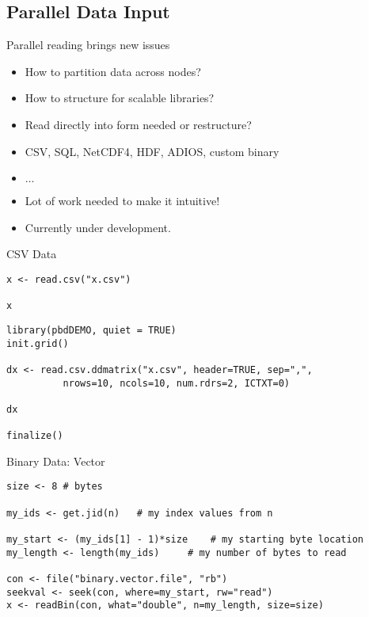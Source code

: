 \subsection{Parallel Data Input}
\makesubcontentsslidessec


\begin{frame}
  \begin{block}{Parallel reading brings new issues}\pause
    \begin{itemize}
    \item How to partition data across nodes?
    \item How to structure for scalable libraries?
    \item Read directly into form needed or restructure?
    \item CSV, SQL, NetCDF4, HDF, ADIOS, custom binary
    \item $\ldots$
    \item Lot of work needed to make it intuitive!
    \item Currently under development.
    \end{itemize}
  \end{block}
\end{frame}



\begin{frame}[fragile]
  \begin{exampleblock}{CSV Data}\pause
\begin{lstlisting}[title=Serial Code]
x <- read.csv("x.csv")

x
\end{lstlisting}

\begin{lstlisting}[title=Parallel Code]
library(pbdDEMO, quiet = TRUE)
init.grid()

dx <- read.csv.ddmatrix("x.csv", header=TRUE, sep=",", 
          nrows=10, ncols=10, num.rdrs=2, ICTXT=0)

dx

finalize()
\end{lstlisting}
  \end{exampleblock}
\end{frame}

\begin{frame}[fragile]
  \begin{exampleblock}{Binary Data: Vector}\pause
    \begin{lstlisting}
size <- 8 # bytes

my_ids <- get.jid(n)   # my index values from n

my_start <- (my_ids[1] - 1)*size    # my starting byte location
my_length <- length(my_ids)     # my number of bytes to read

con <- file("binary.vector.file", "rb")
seekval <- seek(con, where=my_start, rw="read")
x <- readBin(con, what="double", n=my_length, size=size)
    \end{lstlisting}
  \end{exampleblock}
\end{frame}

